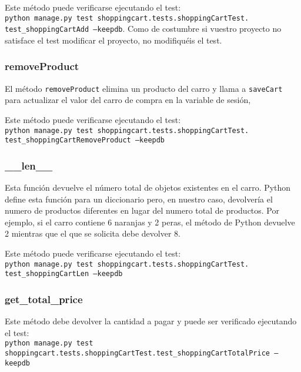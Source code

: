 \documentclass[12pt]{article} %
\newcommand{\ttt}[1]{\texttt{#1}}%
\begin{document}
Este método puede verificarse ejecutando el test:\\ \ttt{python manage.py test shoppingcart.tests.shoppingCartTest.\\test\_shoppingCartAdd --keepdb}. Como de costumbre
si vuestro proyecto no satisface el test modificar el proyecto, no modifiquéis el test.

\subsubsection{removeProduct}

El método \ttt{removeProduct} elimina un producto del carro y llama a \ttt{saveCart}
para actualizar el valor del carro de compra en la variable de sesión,

Este método puede verificarse ejecutando el test:\\ \ttt{python manage.py test shoppingcart.tests.shoppingCartTest.\\test\_shoppingCartRemoveProduct --keepdb}

\subsubsection{\_\_len\_\_}


Esta función devuelve el número total de objetos existentes en el carro. Python define esta función para un diccionario pero, en nuestro caso, devolvería el numero de productos diferentes en lugar del numero total de productos. Por ejemplo, si el carro contiene 6 naranjas y 2 peras, el método de Python devuelve 2 mientras que el que se solicita debe devolver 8.

Este método puede verificarse ejecutando el test:\\ \ttt{python manage.py test shoppingcart.tests.shoppingCartTest.\\test\_shoppingCartLen --keepdb}


\subsubsection{get\_total\_price}
Este método debe devolver la cantidad a pagar y puede ser verificado ejecutando el test:\\ \ttt{python manage.py test shoppingcart.tests.shoppingCartTest.test\_shoppingCartTotalPrice --keepdb}
\end{document}
